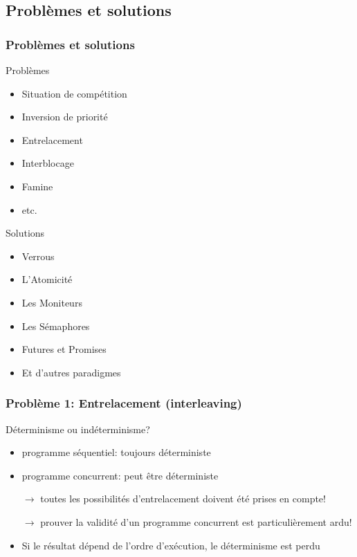 \documentclass{beamer}
\begin{document}
\subsection{Problèmes et solutions}
\begin{frame}
  \frametitle{Problèmes et solutions}
  \begin{minipage}{.49\textwidth}
    Problèmes
    \begin{itemize}
    \item Situation de compétition
    \item Inversion de priorité
    \item Entrelacement
    \item Interblocage
    \item Famine
    \item etc.
    \end{itemize}
  \end{minipage}
  \begin{minipage}{.49\textwidth}
    Solutions
    \begin{itemize}
    \item Verrous
    \item L'Atomicité
    \item Les Moniteurs
    \item Les Sémaphores
    \item Futures et Promises
    \item Et d'autres paradigmes
    \end{itemize}
  \end{minipage}
\end{frame} %
\begin{frame}
  \frametitle{Problème 1: Entrelacement (interleaving)}
  Déterminisme ou indéterminisme?
  \begin{itemize}
  \item programme séquentiel: toujours déterministe
  \item programme concurrent: peut être déterministe
    \par$\rightarrow$
    toutes les possibilités d'entrelacement doivent été prises en compte!
    \par$\rightarrow$
    prouver la validité d'un programme concurrent est particulièrement ardu!
  \item Si le résultat dépend de l'ordre d'exécution, le déterminisme est perdu
  \end{itemize}
\end{frame} %
\end{document}
